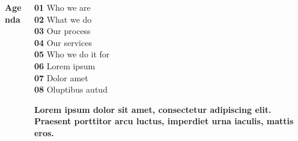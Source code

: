 \documentclass[
	aspectratio=169, %
	t, %
	onlytextwidth, %
	10pt, %
]{beamer}
\begin{document}
	\begin{frame}
		\begin{columns}[T] %
			\begin{column}{0.48\linewidth} %
				\HUGE\textbf{Agenda}
			\end{column}
			\begin{column}{0.48\linewidth} %
				\textbf{01} Who we are\\ %
				\textbf{02} What we do\\
				\textbf{03} Our process\\
				\textbf{04} Our services\\
				\textbf{05} Who we do it for\\
				\textbf{06} Lorem ipsum\\
				\textbf{07} Dolor amet\\
				\textbf{08} Oluptibus autud
				
				\textbf{Lorem ipsum dolor sit amet, consectetur adipiscing elit. Praesent porttitor arcu luctus, imperdiet urna iaculis, mattis eros.}
			\end{column}
		\end{columns}
	\end{frame}
\endgroup



\begingroup
	
\end{document}
